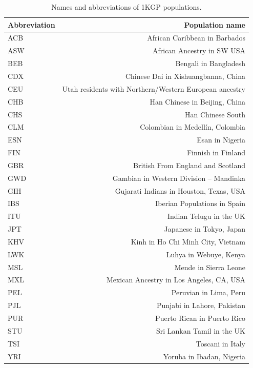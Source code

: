 \clearpage

\begin{table}[ht]
\centering
\begin{tabular}{l|r}
Abbreviation & Population name\\
\hline
 ACB & African Caribbean in Barbados\\
 \hline
    ASW & African Ancestry in SW USA \\
 \hline
    BEB & Bengali in Bangladesh\\
 \hline
    CDX & Chinese Dai in Xishuangbanna, China\\
 \hline
    CEU & Utah residents with Northern/Western European ancestry\\
 \hline
    CHB & Han Chinese in Beijing, China\\
 \hline
    CHS & Han Chinese South\\
 \hline
    CLM & Colombian in Medell\'{i}n, Colombia\\
 \hline
    ESN & Esan in Nigeria\\
 \hline
    FIN & Finnish in Finland\\
 \hline
    GBR & British From England and Scotland\\
 \hline
    GWD & Gambian in Western Division -- Mandinka\\
 \hline
    GIH & Gujarati Indians in Houston, Texas, USA\\
 \hline
    IBS & Iberian Populations in Spain\\
 \hline
    ITU & Indian Telugu in the UK\\
 \hline
    JPT & Japanese in Tokyo, Japan\\
 \hline
    KHV & Kinh in Ho Chi Minh City, Vietnam\\
 \hline
    LWK & Luhya in Webuye, Kenya\\
 \hline
    MSL & Mende in Sierra Leone\\
 \hline
    MXL & Mexican Ancestry in Los Angeles, CA, USA\\
 \hline
    PEL & Peruvian in Lima, Peru\\
 \hline
    PJL & Punjabi in Lahore, Pakistan\\
 \hline
    PUR & Puerto Rican in Puerto Rico\\
 \hline
    STU & Sri Lankan Tamil in the UK\\
 \hline
    TSI & Toscani in Italy\\
 \hline
    YRI & Yoruba in Ibadan, Nigeria\\
\end{tabular}
\caption{Names and abbreviations of 1KGP populations.}
\label{table:1kgp_labels} 
\end{table} 

